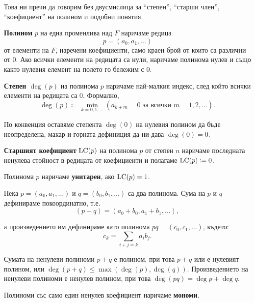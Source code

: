 \documentclass{../../common/topic}
\begin{document}
Това ни пречи да говорим без двусмислица за \enquote{степен}, \enquote{старши член}, \enquote{коефициент} на полином и подобни понятия.

\begin{definition}
  \textbf{Полином} \( p \) на една променлива над \( F \) наричаме редица
  \begin{equation*}
    p = (a_0, a_1, \ldots)
  \end{equation*}
  от елементи на \( F \), наречени коефициенти, само краен брой от които са различни от \( 0 \). Ако всички елементи на редицата са нули, наричаме полинома нулев и също както нулевия елемент на полето го бележим с \( 0 \).

  \textbf{Степен \( \deg(p) \)} на полинома \( p \) наричаме най-малкия индекс, след който всички елементи на редицата са \( 0 \). Формално,
  \begin{equation*}
    \deg(p) \coloneqq \min_{k = 0, 1, \ldots} (a_{k + m} = 0 \text{ за всички } m = 1, 2, \ldots).
  \end{equation*}

  По конвенция оставяме степента \( \deg(0) \) на нулевия полином да бъде неопределена, макар и горната дефиниция да ни дава \( \deg(0) = 0 \).

  \textbf{Старшият коефициент} \( \operatorname{LC}(p) \) на полинома \( p \) от степен \( n \) наричаме последната ненулева стойност в редицата от коефициенти и полагаме \( \operatorname{LC}(p) \coloneqq 0 \).

  Полинома \( p \) наричаме \textbf{унитарен}, ако \( \operatorname{LC}(p) = 1 \).
\end{definition}

Нека \( p = (a_0, a_1, \ldots) \) и \( q = (b_0, b_1, \ldots) \) са два полинома. Сума на \( p \) и \( q \) дефинираме покоординатно, т.е.
\begin{equation*}
  (p + q) = (a_0 + b_0, a_1 + b_1, \ldots),
\end{equation*}

а произведението им дефинираме като полинома \( pq = (c_0, c_1, \ldots) \), където:
\begin{equation*}
  c_k = \sum_{i+j=k} a_i b_j.
\end{equation*}

Сумата на ненулеви полиноми \( p + q \) е полином, при това \( p + q \) или е нулевият полином, или \( \deg(p + q) \leq \max(\deg(p), \deg(q)) \). Произведението на ненулеви полиноми е ненулев полином, при това \( \deg(pq) = \deg p + \deg q \).

Полиноми със само един ненулев коефициент наричаме \textbf{мономи}.
\end{document}
